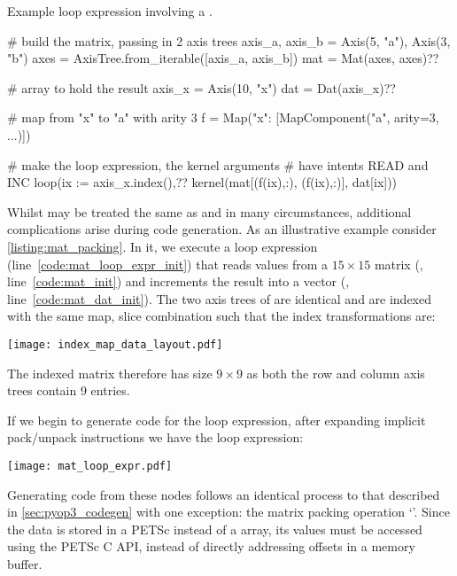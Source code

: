 \documentclass[thesis]{subfiles}
\begin{document}
\begin{listing}
  \caption{
    Example loop expression involving a .
  }
  \centering
  \begin{minipage}{.9\textwidth}
    \begin{pyalg2}
      # build the matrix, passing in 2 axis trees
      axis_a, axis_b = Axis(5, "a"), Axis(3, "b")
      axes = AxisTree.from_iterable([axis_a, axis_b])
      mat = Mat(axes, axes)?\label{code:mat_init}?

      # array to hold the result
      axis_x = Axis(10, "x")
      dat = Dat(axis_x)?\label{code:mat_dat_init}?

      # map from "x" to "a" with arity 3
      f = Map({"x": [MapComponent("a", arity=3, ...)]})

      # make the loop expression, the kernel arguments
      # have intents READ and INC
      loop(ix := axis_x.index(),?\label{code:mat_loop_expr_init}?
           kernel(mat[(f(ix),:), (f(ix),:)], dat[ix]))
    \end{pyalg2}
  \end{minipage}
  \label{listing:mat_packing}
\end{listing}

Whilst  may be treated the same as  and  in many circumstances, additional complications arise during code generation.
As an illustrative example consider \cref{listing:mat_packing}.
In it, we execute a loop expression (line~\ref{code:mat_loop_expr_init}) that reads values from a $15 \times 15$ matrix (, line~\ref{code:mat_init}) and increments the result into a vector (, line~\ref{code:mat_dat_init}).
The two axis trees of  are identical and are indexed with the same map, slice combination such that the index transformations are:
\begin{center}
  \texttt{[image: index\_map\_data\_layout.pdf]}
\end{center}
The indexed matrix therefore has size $9 \times 9$ as both the row and column axis trees contain 9 entries.

If we begin to generate code for the loop expression, after expanding implicit pack/unpack instructions we have the loop expression:
\begin{center}
  \texttt{[image: mat\_loop\_expr.pdf]}
\end{center}
Generating code from these nodes follows an identical process to that described in \cref{sec:pyop3_codegen} with one exception: the matrix packing operation `'.
Since the data is stored in a PETSc  instead of a \numpy array, its values must be accessed using the PETSc C API, instead of directly addressing offsets in a memory buffer.
\end{document}
